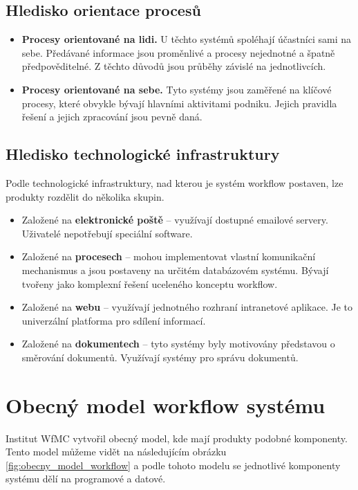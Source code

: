 \documentclass{fithesis}
\begin{document}
\subsection*{Hledisko orientace procesů}
\begin{itemize}
\item \textbf{Procesy orientované na lidi.} U těchto systémů spoléhají účastníci sami na sebe. Předávané informace jsou proměnlivé a procesy nejednotné a špatně předpověditelné. Z těchto důvodů jsou průběhy závislé na jednotlivcích.
\item \textbf{Procesy orientované na sebe.} Tyto systémy jsou zaměřené na klíčové procesy, které obvykle bývají hlavními aktivitami podniku. Jejich pravidla řešení a jejich zpracování jsou pevně daná.
\end{itemize}

\subsection*{Hledisko technologické infrastruktury}
Podle technologické infrastruktury, nad kterou je systém workflow postaven, lze produkty rozdělit do několika skupin.
\begin{itemize}
\item Založené na \textbf{elektronické poště} -- využívají dostupné emailové servery. Uživatelé nepotřebují speciální software.
\item Založené na \textbf{procesech} -- mohou implementovat vlastní komunikační mechanismus a jsou postaveny na určitém databázovém systému. Bývají tvořeny jako komplexní řešení uceleného konceptu workflow.
\item Založené na \textbf{webu} -- využívají jednotného rozhraní intranetové aplikace. Je to univerzální platforma pro sdílení informací.
\item Založené na \textbf{dokumentech} -- tyto systémy byly motivovány představou o směrování dokumentů. Využívají systémy pro správu dokumentů.
\end{itemize}

\section{Obecný model workflow systému}
Institut WfMC vytvořil obecný model, kde mají produkty podobné komponenty. Tento model můžeme vidět na následujícím obrázku \ref{fig:obecny_model_workflow} a podle tohoto modelu se  jednotlivé komponenty systému dělí na programové a datové.
\end{document}
